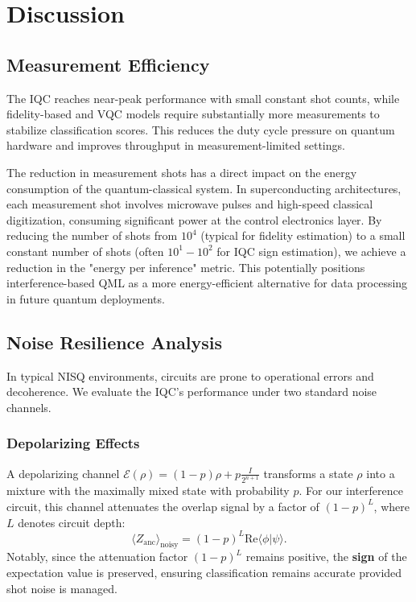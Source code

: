 \documentclass[conference]{IEEEtran}
\begin{document}
\section{Discussion}

\subsection{Measurement Efficiency}
The IQC reaches near-peak performance with small constant shot counts, while fidelity-based and VQC models require substantially more measurements to stabilize classification scores. This reduces the duty cycle pressure on quantum hardware and improves throughput in measurement-limited settings.

The reduction in measurement shots has a direct impact on the energy consumption of the quantum-classical system. In superconducting architectures, each measurement shot involves microwave pulses and high-speed classical digitization, consuming significant power at the control electronics layer. By reducing the number of shots from $10^4$ (typical for fidelity estimation) to a small constant number of shots (often $10^1-10^2$ for IQC sign estimation), we achieve a reduction in the "energy per inference" metric. This potentially positions interference-based QML as a more energy-efficient alternative for data processing in future quantum deployments.

\subsection{Noise Resilience Analysis}
In typical NISQ environments, circuits are prone to operational errors and decoherence. We evaluate the IQC's performance under two standard noise channels.

\subsubsection{Depolarizing Effects}
A depolarizing channel $\mathcal{E}(\rho) = (1-p)\rho + p\frac{I}{2^{n+1}}$ transforms a state $\rho$ into a mixture with the maximally mixed state with probability $p$. For our interference circuit, this channel attenuates the overlap signal by a factor of $(1-p)^L$, where $L$ denotes circuit depth:
\begin{equation}
    \langle Z_{\text{anc}} \rangle_{\text{noisy}} = (1-p)^L \mathrm{Re}\langle \phi | \psi \rangle.
\end{equation}
Notably, since the attenuation factor $(1-p)^L$ remains positive, the \textbf{sign} of the expectation value is preserved, ensuring classification remains accurate provided shot noise is managed.
\end{document}
